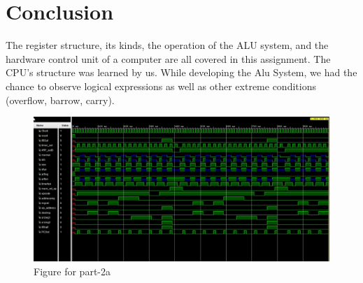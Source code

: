 \documentclass[16pt]{article}
\begin{document}
\section{Conclusion}
The register structure, its kinds, the operation of the ALU system, and the hardware control unit of a computer are all covered in this assignment. The CPU's structure was learned by us. While developing the Alu System, we had the chance to observe logical expressions as well as other extreme conditions (overflow, barrow, carry).


\begin{figure}[H]
    \centering
    \includegraphics[width=6in]{hcu.jpg}
    \caption{Figure for part-2a}
    
\end{figure}
\end{document}
